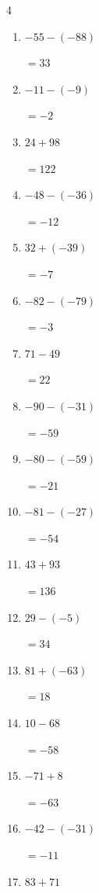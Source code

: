 \begin{multicols}{4}
\begin{enumerate}
        $=22$

  \item $-55-(-88)$

        $=33$

  \item $-11-(-9)$

        $=-2$

  \item $24+98$

        $=122$

  \item $-48-(-36)$

        $=-12$

  \item $32+(-39)$

        $=-7$

  \item $-82-(-79)$

        $=-3$

  \item $71-49$

        $=22$

  \item $-90-(-31)$

        $=-59$

\columnbreak %

  \item $-80-(-59)$

        $=-21$

  \item $-81-(-27)$

        $=-54$

  \item $43+93$

        $=136$

  \item $29-(-5)$

        $=34$

  \item $81+(-63)$

        $=18$

  \item $10-68$

        $=-58$

  \item $-71+8$

        $=-63$

  \item $-42-(-31)$

        $=-11$

  \item $83+71$


\end{enumerate}
\end{multicols}
